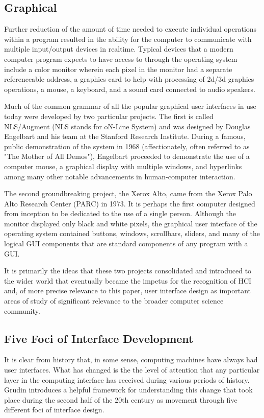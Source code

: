 \subsection{Graphical}

Further reduction of the amount of time needed to execute individual operations within a program resulted in the ability for the computer to communicate with multiple input/output devices in realtime. Typical devices that a modern computer program expects to have access to through the operating system include a color monitor wherein each pixel in the monitor had a separate referenceable address, a graphics card to help with processing of 2d/3d graphics operations, a mouse, a keyboard, and a sound card connected to audio speakers.

Much of the common grammar of all the popular graphical user interfaces in use today were developed by two particular projects. The first is called NLS/Augment (NLS stands for oN-Line System) and was designed by Douglas Engelbart and his team at the Stanford Research Institute. During a famous, public demonstration of the system in 1968 (affectionately, often referred to as "The Mother of All Demos"), Engelbart proceeded to demonstrate the use of a computer mouse, a graphical display with multiple windows, and hyperlinks among many other notable advancements in human-computer interaction. 

The second groundbreaking project, the Xerox Alto, came from the Xerox Palo Alto Research Center (PARC) in 1973. It is perhaps the first computer designed from inception to be dedicated to the use of a single person. Although the monitor displayed only black and white pixels, the graphical user interface of the operating system contained buttons, windows, scrollbars, sliders, and many of the logical GUI components that are standard components of any program with a GUI.

It is primarily the ideas that these two projects consolidated and introduced to the wider world that eventually became the impetus for the recognition of HCI and, of more precise relevance to this paper, user interface design as important areas of study of significant relevance to the broader computer science community. 

\subsection{Five Foci of Interface Development}

It is clear from history that, in some sense, computing machines have always had user interfaces. What has changed is the the level of attention that any particular layer in the computing interface has received during various periods of history. Grudin \cite{continuity1990} introduces a helpful framework for understanding this change that took place during the second half of the 20th century as movement through five different foci of interface design. 

